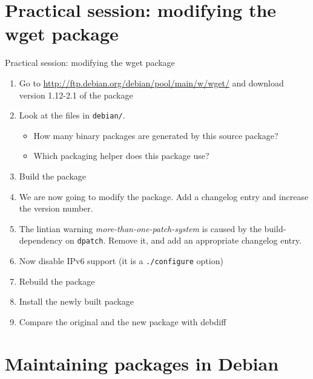 \documentclass[10pt,final]{beamer}
\begin{document}
\section{Practical session: modifying the wget package}
\begin{frame}{Practical session: modifying the wget package}
\begin{enumerate}
	\item Go to \url{http://ftp.debian.org/debian/pool/main/w/wget/} and
		download version 1.12-2.1 of the package
	\item Look at the files in \texttt{debian/}.
		\begin{itemize}
			\item 		How many binary packages are generated by this source package?
			\item 		Which packaging helper does this package use?
		\end{itemize}
	\item Build the package
	\item We are now going to modify the package. Add a changelog entry and increase the version number.
	\item The lintian warning \textsl{more-than-one-patch-system} is caused by the build-dependency on \texttt{dpatch}. Remove it, and add an appropriate changelog entry.
	\item Now disable IPv6 support (it is a \texttt{./configure} option)
	\item Rebuild the package
	\item Install the newly built package
	\item Compare the original and the new package with debdiff
\end{enumerate}
\end{frame}

\section{Maintaining packages in Debian}
\end{document}
